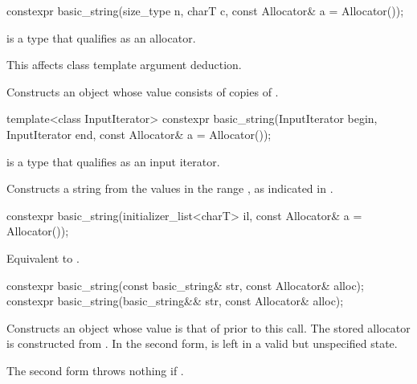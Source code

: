 %
\begin{itemdecl}
constexpr basic_string(size_type n, charT c, const Allocator& a = Allocator());
\end{itemdecl}

\begin{itemdescr}
\pnum
\constraints
{} is a type
that qualifies as an allocator.
\begin{note}
This affects class template argument deduction.
\end{note}

\pnum
\effects
Constructs an object whose value consists of  copies of .
\end{itemdescr}

%
\begin{itemdecl}
template<class InputIterator>
  constexpr basic_string(InputIterator begin, InputIterator end, const Allocator& a = Allocator());
\end{itemdecl}

\begin{itemdescr}
\pnum
\constraints
{} is a type that qualifies as an input
iterator.

\pnum
\effects
Constructs a string from the values in the range ,
as indicated in .
\end{itemdescr}

%
\begin{itemdecl}
constexpr basic_string(initializer_list<charT> il, const Allocator& a = Allocator());
\end{itemdecl}

\begin{itemdescr}
\pnum
\effects
Equivalent to .
\end{itemdescr}

%
\begin{itemdecl}
constexpr basic_string(const basic_string& str, const Allocator& alloc);
constexpr basic_string(basic_string&& str, const Allocator& alloc);
\end{itemdecl}

\begin{itemdescr}
\pnum
\effects
Constructs an object whose value is
that of  prior to this call.
The stored allocator is constructed from .
In the second form,  is left in a valid but unspecified state.

\pnum
\throws
The second form throws nothing if .
\end{itemdescr}

